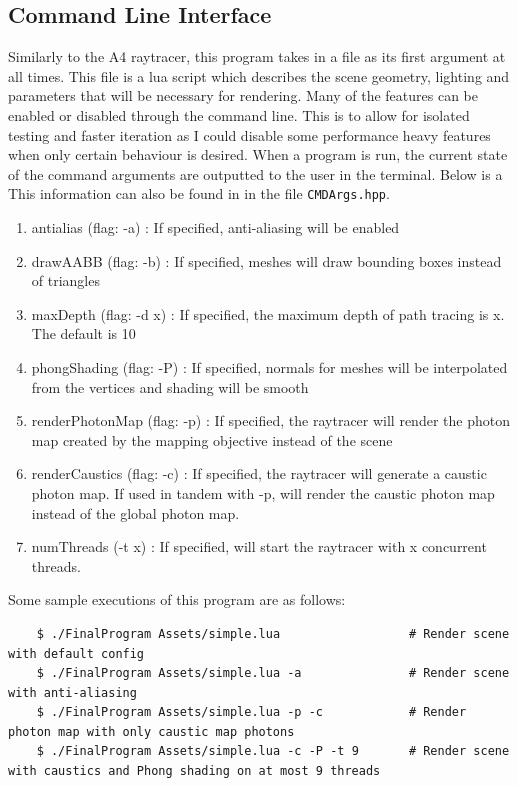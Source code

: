 \documentclass {article}
\begin{document}
\subsection{Command Line Interface}
Similarly to the A4 raytracer, this program takes in a file as its first argument at all times.
This file is a lua script which describes the scene geometry, lighting and parameters that
will be necessary for rendering. Many of the features can be enabled or disabled through the command line. This is
to allow for isolated testing and faster iteration as I could disable some performance
heavy features when only certain behaviour is desired. When a program is run, the current
state of the command arguments are outputted to the user in the terminal. Below is a 
This information can also be found in in the file \texttt{CMDArgs.hpp}.
\begin{enumerate}
    \item antialias (flag: -a) : If specified, anti-aliasing will be enabled
    \item drawAABB (flag: -b) : If specified, meshes will draw bounding boxes instead of triangles
    \item maxDepth (flag: -d x) : If specified, the maximum depth of path tracing is x. The default is 10
    \item phongShading (flag: -P) : If specified, normals for meshes will be interpolated from the vertices and shading will be smooth
    \item renderPhotonMap (flag: -p) : If specified, the raytracer will render the photon map created by the mapping objective instead of the scene
    \item renderCaustics (flag: -c) : If specified, the raytracer will generate a caustic photon map. If used in tandem with -p, will render the caustic
    photon map instead of the global photon map.
    \item numThreads (-t x) : If specified, will start the raytracer with x concurrent threads.
\end{enumerate}
Some sample executions of this program are as follows:
\begin{verbatim}
    $ ./FinalProgram Assets/simple.lua                  # Render scene with default config
    $ ./FinalProgram Assets/simple.lua -a               # Render scene with anti-aliasing
    $ ./FinalProgram Assets/simple.lua -p -c            # Render photon map with only caustic map photons
    $ ./FinalProgram Assets/simple.lua -c -P -t 9       # Render scene with caustics and Phong shading on at most 9 threads
\end{verbatim}
\end{document}
